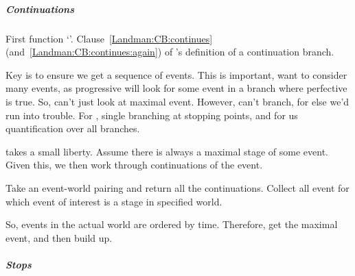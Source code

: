 \subparagraph{Continuations}

\begin{note}
  First function `\AlgAC{}'.
  Clause~\ref{Landman:CB:continues} (and~\ref{Landman:CB:continues:again}) of \citeauthor{Landman:1992wh}'s definition of a continuation branch.

  \begin{algorithm}[H]
    \label{PrAl:g-a-c}
    \caption{\AlgAC{}}
    \SetAlgoLined
    \DontPrintSemicolon
  \end{algorithm}

  Key is to ensure we get a sequence of events.
  This is important, want to consider many events, as progressive will look for some event in a branch where perfective is true.
  So, can't just look at maximal event.
  However, can't branch, for else we'd run into trouble.
  For \citeauthor{Landman:1992wh}, single branching at stopping points, and for us quantification over all branches.

  \AlgAC{} takes a small liberty.
  Assume there is always a maximal stage of some event.
  Given this, we then work through continuations of the event.

  Take an event-world pairing and return all the continuations.
  Collect all event for which event of interest is a stage in specified world.

  So, events in the actual world are ordered by time.
  Therefore, get the maximal event, and then build up.
\end{note}

\subparagraph{Stops}

